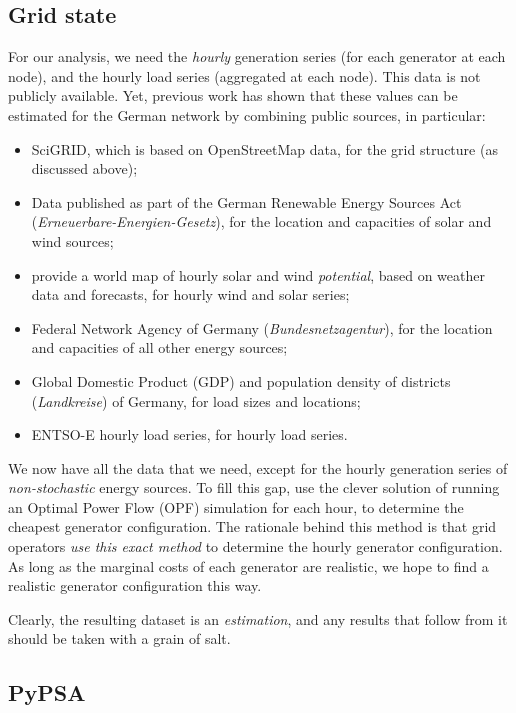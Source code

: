 \documentclass[main.tex]{subfiles}
\begin{document}
\subsection{Grid state}
For our analysis, we need the \emph{hourly} generation series (for each generator at each node), and the hourly load series (aggregated at each node). This data is not publicly available. Yet, previous work \citep{PyPSA} has shown that these values can be estimated for the German network by combining public sources, in particular:
\begin{itemize}
\item SciGRID, which is based on OpenStreetMap data, for the grid structure (as discussed above);
\item Data published as part of the German Renewable Energy Sources Act (\emph{Erneuerbare-Energien-Gesetz}), for the location and capacities of solar and wind sources;
\item \cite{Andresen2015} provide a world map of hourly solar and wind \emph{potential}, based on weather data and forecasts, for hourly wind and solar series;
\item Federal Network Agency of Germany (\emph{Bundesnetzagentur}), for the location and capacities of all other energy sources;
\item Global Domestic Product (GDP) and population density of districts (\emph{Landkreise}) of Germany, for load sizes and locations;
\item ENTSO-E hourly load series, for hourly load series.
\end{itemize}
We now have all the data that we need, except for the hourly generation series of \emph{non-stochastic} energy sources. To fill this gap, \cite{PyPSA} use the clever solution of running an Optimal Power Flow (OPF) simulation for each hour, to determine the cheapest generator configuration. The rationale behind this method is that grid operators \emph{use this exact method} to determine the hourly generator configuration. As long as the marginal costs of each generator are realistic, we hope to find a realistic generator configuration this way.

Clearly, the resulting dataset is an \emph{estimation}, and any results that follow from it should be taken with a grain of salt. 
\subsection{PyPSA}
\end{document}
